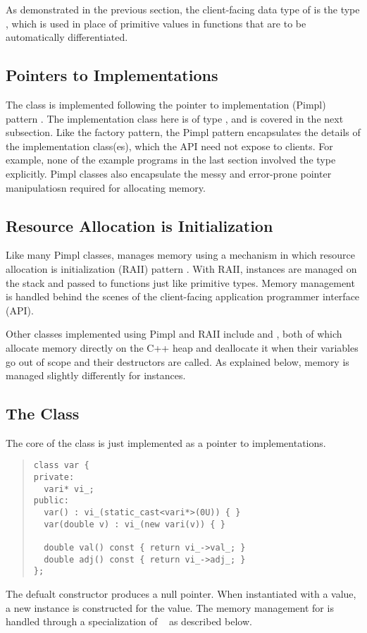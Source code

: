 \documentclass[10pt]{article}
\begin{document}
As demonstrated in the previous section, the client-facing data type
of  is the type , which is
used in place of primitive  values in functions that are
to be automatically differentiated.  

\subsection{Pointers to Implementations}

The  class is implemented following the pointer to
implementation (Pimpl) pattern \citep{sutter:98,sutter:01}.  The
implementation class here is of type , and is covered in
the next subsection.  Like the factory pattern, the Pimpl pattern
encapsulates the details of the implementation class(es), which the
API need not expose to clients.  For example, none of the example
programs in the last section involved the  type explicitly.
Pimpl classes also encapsulate the messy and error-prone pointer
manipulatiosn required for allocating memory.  

\subsection{Resource Allocation is Initialization}

Like many Pimpl classes,  manages memory using a mechanism
in which resource allocation is initialization (RAII) pattern
\citep{stroustrup:94}.  With RAII, instances are managed on the stack
and passed to functions just like primitive types.  Memory management
is handled behind the scenes of the client-facing application
programmer interface (API).

Other classes implemented using Pimpl and RAII include
 and , both of which allocate
memory directly on the C++ heap and deallocate it when their variables
go out of scope and their destructors are called.  As explained below,
memory is managed slightly differently for 
instances.

\subsection{The  Class}

The core of the  class is just implemented as a
pointer to implementations.
%
\begin{quote}
\begin{Verbatim}
class var {
private:
  vari* vi_;
public:
  var() : vi_(static_cast<vari*>(0U)) { }
  var(double v) : vi_(new vari(v)) { }

  double val() const { return vi_->val_; }
  double adj() const { return vi_->adj_; }  
};
\end{Verbatim}
\end{quote}
%
The defualt constructor  produces a null pointer.  When
instantiated with a  value, a new  instance is
constructed for the value.  The memory management for  is
handled through a specialization of ~ as
described below.
\end{document}
